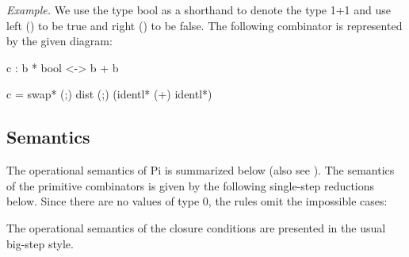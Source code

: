 \documentclass[preprint]{sigplanconf}
\begin{document}
\noindent 
\textit{Example.}  We use the type {{bool}} as a shorthand to denote
the type {{1+1}} and use {{left ()}} to be {{true}} and {{right ()}}
to be {{false}}. The following combinator is represented by the given
diagram:

{{c : b * bool <-> b + b}}

{{c = swap* (;) dist (;) (identl* (+) identl*)}}

\begin{center}
\end{center}

\subsection{Semantics}

The operational semantics of {{Pi}} is summarized below (also see
\cite{infeffects}).  The semantics of the primitive combinators is
given by the following single-step reductions below. Since there are
no values of type {{0}}, the rules omit the impossible cases:
\begin{scriptsize}

The operational semantics of the closure conditions are presented in
the usual big-step style.

%
%
%
\end{scriptsize}
\end{document}
